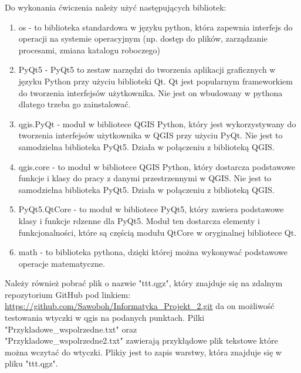 Do wykonania ćwiczenia należy użyć następujących bibliotek:
\begin{enumerate}
	\item os - to biblioteka standardowa w języku python, która zapewnia interfejs do operacji na systemie operacyjnym (np. dostęp do plików, zarządzanie procesami, zmiana katalogu roboczego)
	\item PyQt5 - PyQt5 to zestaw narzędzi do tworzenia aplikacji graficznych w języku Python przy użyciu biblioteki Qt. Qt jest popularnym frameworkiem do tworzenia interfejsów użytkownika. Nie jest on wbudowany w pythona dlatego trzeba go zainstalować.
	\item qgis.PyQt - moduł w bibliotece QGIS Python, który jest wykorzystywany do tworzenia interfejsów użytkownika w QGIS przy użyciu PyQt. Nie jest to samodzielna biblioteka PyQt5. Działa w połączeniu z biblioteką QGIS.
	\item qgis.core - to moduł w bibliotece QGIS Python, który dostarcza podstawowe funkcje i klasy do pracy z danymi przestrzennymi w QGIS. Nie jest to samodzielna biblioteka PyQt5. Działa w połączeniu z biblioteką QGIS.
	\item PyQt5.QtCore - to moduł w bibliotece PyQt5, który zawiera podstawowe klasy i funkcje rdzenne dla PyQt5. Moduł ten dostarcza elementy i funkcjonalności, które są częścią modułu QtCore w oryginalnej bibliotece Qt.
	\item math - to biblioteka pythona, dzięki której można wykonywać podstawowe operacje matematyczne.
\end{enumerate}

Należy również pobrać plik o nazwie "ttt.qgz", który znajduje się na zdalnym repozytorium GitHub pod linkiem: \href{https://github.com/Sawoboh/Informatyka_Projekt_2.git}{https://github.com/Sawoboh/Informatyka\_Projekt\_2.git} da on możliwość testowania wtyczki w qgis na podanych punktach. Pilki "Przykladowe\_wspolrzedne.txt" oraz\\ "Przykladowe\_wspolrzedne2.txt" zawierają przykłądowe plik tekstowe które można wczytać do wtyczki. Plikiy jest to zapis warstwy, która znajduje się w pliku "ttt.qgz". 